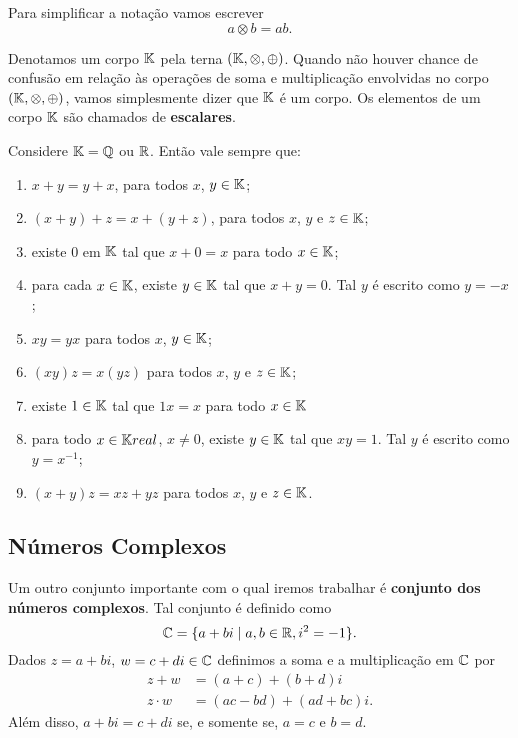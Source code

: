 Para simplificar a nota\c{c}\~ao vamos escrever
\[
	a \otimes b = ab.
\]

Denotamos um corpo $\mathbb{K}$ pela terna $(\mathbb{K}, \otimes, \oplus)$. Quando n\~ao houver chance de confus\~ao em rela\c{c}\~ao \`as opera\c{c}\~oes de soma e multiplica\c{c}\~ao envolvidas no corpo $(\mathbb{K}, \otimes, \oplus)$, vamos simplesmente dizer que $\mathbb{K}$ \'e um corpo. Os elementos de um corpo $\mathbb{K}$ s\~ao chamados de \textbf{escalares}.

Considere $\mathbb{K} = \mathbb{Q}$ ou $\mathbb{R}$. Então vale sempre que:
\begin{enumerate}
	\item $x + y = y + x$, para todos $x$, $y \in \mathbb{K}$;

	\item $(x + y) + z = x + (y + z)$, para todos $x$, $y$ e $z \in \mathbb{K}$;

	\item existe $0$ em $\mathbb{K}$ tal que $x + 0 = x$ para todo $x \in \mathbb{K}$;
	
	\item para cada $x \in \mathbb{K}$, existe $y \in \mathbb{K}$ tal que $x + y = 0$. Tal $y$ é escrito como $y = -x$;

	\item $xy = yx$ para todos $x$, $y \in \mathbb{K}$;
	
	\item $(xy)z = x(yz)$ para todos $x$, $y$ e $z \in \mathbb{K}$;

	\item existe $1 \in \mathbb{K}$ tal que $1x = x$ para todo $x \in \mathbb{K}$
	
	\item para todo $x \in \mathbb{K}real$, $x \ne 0$, existe $y \in \mathbb{K}$ tal que $xy =1$. Tal $y$ é escrito como $y = x^{-1}$;
	
	\item $(x + y)z = xz + yz$ para todos $x$, $y$ e $z \in \mathbb{K}$.
\end{enumerate}

\subsection{Números Complexos}
Um outro conjunto importante com o qual iremos trabalhar é \textbf{conjunto dos números complexos}. Tal conjunto \'e definido como
\[
	\mathbb{C} = \{a + bi \mid a, b \in \mathbb{R}, i^2 = -1\}.
\]
Dados $z = a + bi$, $w = c + di \in \mathbb{C}$ definimos a soma e a multiplica\c{c}\~ao em $\mathbb{C}$ por
\begin{align*}
	z + w &= (a + c) + (b + d)i\\
	z\cdot w &= (ac - bd) + (ad + bc)i.
\end{align*}
Al\'em disso, $a + bi = c + di$ se, e somente se, $a = c$ e $b = d$.

